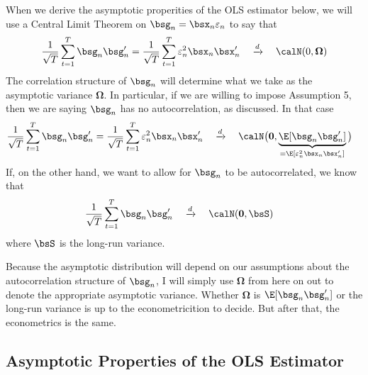 \documentclass[12pt]{article}
\theoremstyle{plain}
\theoremstyle{definition}
\theoremstyle{remark}
\newcommand{\bsOmega}{\boldsymbol{\Omega}}
\renewcommand{\bso}{\boldsymbol{0}}
\newcommand{\dto}{\xrightarrow{d}}
\newcommand{\sumtT}{\sum^T_{t=1}}
\begin{document}
When we derive the asymptotic properities of the OLS estimator below, we
will use a Central Limit Theorem on $\bsg_n=\bsx_n\varepsilon_n$ to say
that
\begin{align*}
  \frac{1}{\sqrt{T}}\sumtT \bsg_n\bsg_n'
  = \frac{1}{\sqrt{T}}\sumtT \varepsilon_n^2\bsx_n\bsx_n'
  \quad\dto\quad \calN(0,\bsOmega)
\end{align*}
The correlation structure of $\bsg_n$ will determine what we take as
the asymptotic variance $\bsOmega$. In particular, if we are willing to
impose Assumption 5, then we are saying $\bsg_n$ has no autocorrelation,
as discussed. In that case
\begin{align*}
  \frac{1}{\sqrt{T}}\sumtT \bsg_n\bsg_n'
  =
  \frac{1}{\sqrt{T}}\sumtT \varepsilon_n^2\bsx_n\bsx_n'
  \quad&\dto\quad
  \calN\big(\bso,
        \underbrace{\E[\bsg_n\bsg_n']}_{=\E[\varepsilon_n^2\bsx_n\bsx_n']}
        \big)
\end{align*}
If, on the other hand, we want to allow for $\bsg_n$ to be
autocorrelated, we know that
\begin{align*}
  \frac{1}{\sqrt{T}}\sumtT \bsg_n\bsg_n'
  \quad&\dto\quad
  \calN(\bso,\bsS)
\end{align*}
where $\bsS$ is the long-run variance.

Because the asymptotic distribution will depend on our assumptions about
the autocorrelation structure of $\bsg_n$, I will simply use $\bsOmega$
from here on out to denote the appropriate asymptotic variance. Whether
$\bsOmega$ is $\E[\bsg_n\bsg_n']$ or the long-run variance is up to the
econometricition to decide. But after that, the econometrics is the
same.


\clearpage
\subsection{Asymptotic Properties of the OLS Estimator}
\end{document}
